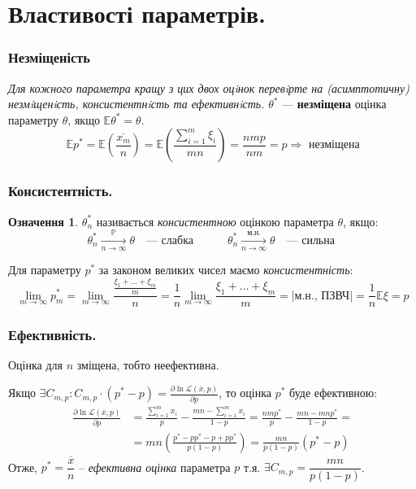 \documentclass[14pt,a4paper]{scrartcl}
\theoremstyle{definition}
\newtheorem*{defo}{Означення}
\theoremstyle{remark}
\theoremstyle{definition}
\theoremstyle{definition}
\def\i{\infty}                 %
\def\d{\partial}               %
\begin{document}
 \section{Властивості параметрів.}
 \subsubsection*{Незміщеність}
 \textit{Для кожного параметра кращу з цих двох оцiнок перевiрте на (асимптотичну) незмiщенiсть,
консистентнiсть та ефективнiсть.}
$\theta^*$ --- \textbf{незміщена} оцінка параметру $\theta$, якщо $\mathbb{E} \theta^* = \theta$.
\[
\mathbb{E} p^* = \mathbb{E} \left( \frac{\overline{x_m}}{n} \right) = \mathbb{E} \left( \frac{ \sum\limits_{i = 1}^{m}{\xi_i}}{mn} \right) =  \frac{nmp}{nm} = p \Longrightarrow \textit{ незміщена}
\]
\subsubsection*{Консистентність.}

\begin{defo} $\theta^*_n$ називається \textit{консистентною} оцінкою параметра $\theta$, якщо:
$$
\theta^*_n \xrightarrow[n\to\infty]{\mathbb{P}} \theta \quad \textit{--- слабка} \qquad \quad
\theta^*_n \xrightarrow[n\to\infty]{\text{м.н.}} \theta \quad \textit{--- сильна }
$$
\end{defo}

Для параметру \( p^*  \) за законом великих чисел маємо \textit{консистентність}:
\[
  \lim\limits_{m\to \i}  p^*_m =  \lim\limits_{m\to \i} \frac{ \frac{\xi_1 + \dots + \xi_m}{m}}{n} = \frac{1}{n}  \lim\limits_{m\to \i}  \frac{\xi_1 + \dots + \xi_m}{m} = \left| \text{м.н., ПЗВЧ} \right|  = \frac{1}{n} \mathbb{E} \xi = p
\]
\subsubsection*{Ефективність.}
Оцінка для \( n \) зміщена, тобто неефективна. \par
Якщо $\exists C_{m, p} : C_{m, p} \cdot(p^* - p) = \frac{\d \ln \mathcal{L} (\overline{x}, p)}{\d p}$, то оцінка  \( p^* \) буде ефективною:
\[
\begin{split}
  \frac{\d \ln \mathcal{L} (\overline{x}, p)}{\d p} & = \frac{ \sum\limits_{i=1}^{m}{x_i}}{p} - \frac{mn -  \sum\limits_{i=1}^{m}{x_i}}{1-p} = \frac{nmp^*}{p} - \frac{mn - mnp^*}{1-p} =  \\
  & = mn \left(  \frac{p^* - pp^* - p + pp^*}{p(1-p)} \right) = \frac{mn}{p(1-p)} (p^* - p)
\end{split}
\]
Отже,  \( p^*  = \dfrac{\overline{x}}{n}\) -- \textit{ефективна оцінка} параметра \( p \) т.я. $\exists C_{m, p} = \dfrac{mn}{p(1-p)} $.
\newpage
\end{document}
